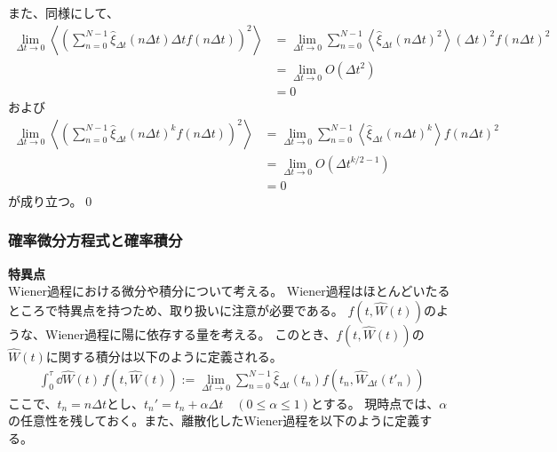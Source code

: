 \documentclass[a4paper,11pt]{jsarticle}
\numberwithin{equation}{section}
\begin{document}
また、同様にして、
\begin{align}
\lim_{\Delta t \to 0} 
\left\langle 
\left( \sum_{n=0}^{N-1} \hat{\xi}_{\Delta t}(n \Delta t) \Delta t f(n \Delta t) \right)^2 
\right\rangle 
&= \lim_{\Delta t \to 0} 
\sum_{n=0}^{N-1} 
\left\langle \hat{\xi}_{\Delta t}(n \Delta t)^2 \right\rangle 
(\Delta t)^2 f(n \Delta t)^2 \\
&= \lim_{\Delta t \to 0} 
O(\Delta t^2)\\
&= 0 
\end{align}
および
\begin{align}
\lim_{\Delta t \to 0}
\left\langle
\left( \sum_{n=0}^{N-1} \hat{\xi}_{\Delta t}(n \Delta t)^k f(n \Delta t) \right)^2
\right\rangle
&= \lim_{\Delta t \to 0}
\sum_{n=0}^{N-1}
\left\langle \hat{\xi}_{\Delta t}(n \Delta t)^k \right\rangle f(n \Delta t)^2 \\
&= \lim_{\Delta t \to 0}
O(\Delta t^{k/2-1})\\
&= 0
\end{align}
が成り立つ。\qed\\

\subsubsection{確率微分方程式と確率積分}
\textbf{特異点}\\
Wiener過程における微分や積分について考える。
Wiener過程はほとんどいたるところで特異点を持つため、取り扱いに注意が必要である。
$f(t,\hat{W}(t))$のような、Wiener過程に陽に依存する量を考える。
このとき、$f(t,\hat{W}(t))$の$\hat{W}(t)$に関する積分は以下のように定義される。
\begin{align}
\int_0^\tau \dd{\hat{W}(t)}\, f(t, \hat{W}(t)) := \lim_{\Delta t \to 0} \sum_{n=0}^{N-1} \hat{\xi}_{\Delta t}(t_n) f(t_n, \hat{W}_{\Delta t}(t'_n)) 
\end{align}
ここで、$t_n = n\Delta t$とし、$t_{n}'=t_{n} + \alpha \Delta t\quad (0\leq \alpha \leq 1)$とする。
現時点では、$\alpha$の任意性を残しておく。また、離散化したWiener過程を以下のように定義する。
\end{document}
